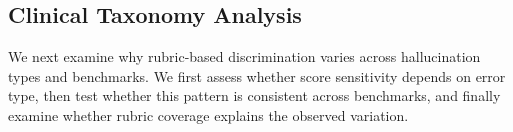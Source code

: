 \documentclass{article}
\begin{document}
\subsection{Clinical Taxonomy Analysis}
\label{sec:clinical_taxonomy_analysis}

We next examine why rubric-based discrimination varies across hallucination types and benchmarks. We first assess whether score sensitivity depends on error type, then test whether this pattern is consistent across benchmarks, and finally examine whether rubric coverage explains the observed variation.


\end{document}
